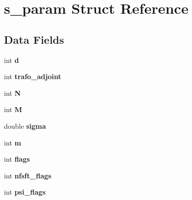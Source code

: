 \hypertarget{structs__param}{\section{s\-\_\-param Struct Reference}
\label{structs__param}
}
\subsection*{Data Fields}
\begin{DoxyCompactItemize}
\item 
\hypertarget{structs__param_a35ae7e155deb56cd9db0a478a90dcbce}{int {\bfseries d}}\label{structs__param_a35ae7e155deb56cd9db0a478a90dcbce}

\item 
\hypertarget{structs__param_ab774ab29ddf684c1adf243b19e25858d}{int {\bfseries trafo\-\_\-adjoint}}\label{structs__param_ab774ab29ddf684c1adf243b19e25858d}

\item 
\hypertarget{structs__param_a5bb17952658c456879c4696d80acb205}{int {\bfseries N}}\label{structs__param_a5bb17952658c456879c4696d80acb205}

\item 
\hypertarget{structs__param_a3be96a7850c7510c9ee724a64af1059d}{int {\bfseries M}}\label{structs__param_a3be96a7850c7510c9ee724a64af1059d}

\item 
\hypertarget{structs__param_afae0fd8933f96ca0d39f11d9f59e1b33}{double {\bfseries sigma}}\label{structs__param_afae0fd8933f96ca0d39f11d9f59e1b33}

\item 
\hypertarget{structs__param_a43995e5d91ee2164a0a786e781067279}{int {\bfseries m}}\label{structs__param_a43995e5d91ee2164a0a786e781067279}

\item 
\hypertarget{structs__param_ad9d83fdb05317d16f7cb4d16393b2bb3}{int {\bfseries flags}}\label{structs__param_ad9d83fdb05317d16f7cb4d16393b2bb3}

\item 
\hypertarget{structs__param_a328a78e1413be0875f873f6516cab41d}{int {\bfseries nfsft\-\_\-flags}}\label{structs__param_a328a78e1413be0875f873f6516cab41d}

\item 
\hypertarget{structs__param_a0ddad8b8daeb96efa32047f9d56f5cb8}{int {\bfseries psi\-\_\-flags}}\label{structs__param_a0ddad8b8daeb96efa32047f9d56f5cb8}


\end{DoxyCompactItemize}
